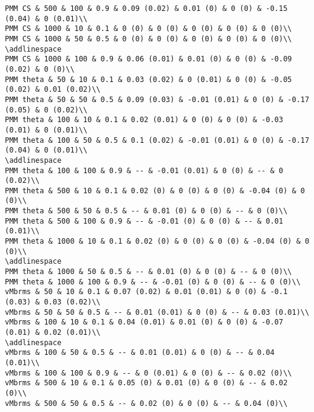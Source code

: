\documentclass[
]{article}
\begin{document}
\begin{verbatim}
PMM CS & 500 & 100 & 0.9 & 0.09 (0.02) & 0.01 (0) & 0 (0) & -0.15 (0.04) & 0 (0.01)\\
PMM CS & 1000 & 10 & 0.1 & 0 (0) & 0 (0) & 0 (0) & 0 (0) & 0 (0)\\
PMM CS & 1000 & 50 & 0.5 & 0 (0) & 0 (0) & 0 (0) & 0 (0) & 0 (0)\\
\addlinespace
PMM CS & 1000 & 100 & 0.9 & 0.06 (0.01) & 0.01 (0) & 0 (0) & -0.09 (0.02) & 0 (0)\\
PMM theta & 50 & 10 & 0.1 & 0.03 (0.02) & 0 (0.01) & 0 (0) & -0.05 (0.02) & 0.01 (0.02)\\
PMM theta & 50 & 50 & 0.5 & 0.09 (0.03) & -0.01 (0.01) & 0 (0) & -0.17 (0.05) & 0 (0.02)\\
PMM theta & 100 & 10 & 0.1 & 0.02 (0.01) & 0 (0) & 0 (0) & -0.03 (0.01) & 0 (0.01)\\
PMM theta & 100 & 50 & 0.5 & 0.1 (0.02) & -0.01 (0.01) & 0 (0) & -0.17 (0.04) & 0 (0.01)\\
\addlinespace
PMM theta & 100 & 100 & 0.9 & -- & -0.01 (0.01) & 0 (0) & -- & 0 (0.02)\\
PMM theta & 500 & 10 & 0.1 & 0.02 (0) & 0 (0) & 0 (0) & -0.04 (0) & 0 (0)\\
PMM theta & 500 & 50 & 0.5 & -- & 0.01 (0) & 0 (0) & -- & 0 (0)\\
PMM theta & 500 & 100 & 0.9 & -- & -0.01 (0) & 0 (0) & -- & 0.01 (0.01)\\
PMM theta & 1000 & 10 & 0.1 & 0.02 (0) & 0 (0) & 0 (0) & -0.04 (0) & 0 (0)\\
\addlinespace
PMM theta & 1000 & 50 & 0.5 & -- & 0.01 (0) & 0 (0) & -- & 0 (0)\\
PMM theta & 1000 & 100 & 0.9 & -- & -0.01 (0) & 0 (0) & -- & 0 (0)\\
vMbrms & 50 & 10 & 0.1 & 0.07 (0.02) & 0.01 (0.01) & 0 (0) & -0.1 (0.03) & 0.03 (0.02)\\
vMbrms & 50 & 50 & 0.5 & -- & 0.01 (0.01) & 0 (0) & -- & 0.03 (0.01)\\
vMbrms & 100 & 10 & 0.1 & 0.04 (0.01) & 0.01 (0) & 0 (0) & -0.07 (0.01) & 0.02 (0.01)\\
\addlinespace
vMbrms & 100 & 50 & 0.5 & -- & 0.01 (0.01) & 0 (0) & -- & 0.04 (0.01)\\
vMbrms & 100 & 100 & 0.9 & -- & 0 (0.01) & 0 (0) & -- & 0.02 (0)\\
vMbrms & 500 & 10 & 0.1 & 0.05 (0) & 0.01 (0) & 0 (0) & -- & 0.02 (0)\\
vMbrms & 500 & 50 & 0.5 & -- & 0.02 (0) & 0 (0) & -- & 0.04 (0)\\

\end{verbatim}
\end{document}
